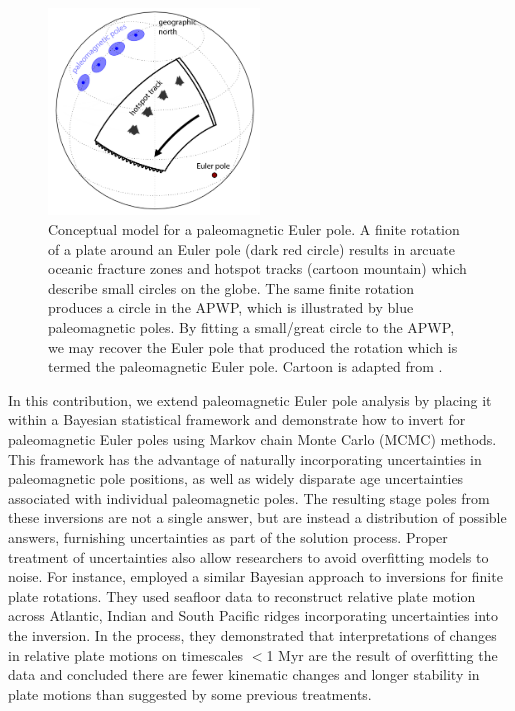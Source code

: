 \documentclass[11pt,letterpaper]{article}
\begin{document}
\begin{figure}
\includegraphics[width=0.5\textwidth]{fig_PEP_annotated.png}
\caption{Conceptual model for a paleomagnetic Euler pole. A finite rotation of a plate around an Euler pole (dark red circle) results in arcuate oceanic fracture zones and hotspot tracks (cartoon mountain) which describe small circles on the globe. The same finite rotation produces a circle in the APWP, which is illustrated by blue paleomagnetic poles. By fitting a small/great circle to the APWP, we may recover the Euler pole that produced the rotation which is termed the paleomagnetic Euler pole. Cartoon is adapted from \cite{Gordon1984a}.}
\label{fig:pep}
\end{figure}

In this contribution, we extend paleomagnetic Euler pole analysis by placing it within a Bayesian statistical framework and demonstrate how to invert for paleomagnetic Euler poles using Markov chain Monte Carlo (MCMC) methods. This framework has the advantage of naturally incorporating uncertainties in paleomagnetic pole positions, as well as widely disparate age uncertainties associated with individual paleomagnetic poles. The resulting stage poles from these inversions are not a single answer, but are instead a distribution of possible answers, furnishing uncertainties as part of the solution process. Proper treatment of uncertainties also allow researchers to avoid overfitting models to noise. For instance, \cite{Iaffaldano2012a} employed a similar Bayesian approach to inversions for finite plate rotations. They used seafloor data to reconstruct relative plate motion across Atlantic, Indian and South Pacific ridges incorporating uncertainties into the inversion. In the process, they demonstrated that interpretations of changes in relative plate motions on timescales $<$1 Myr are the result of overfitting the data and concluded there are fewer kinematic changes and longer stability in plate motions than suggested by some previous treatments.
\end{document}
